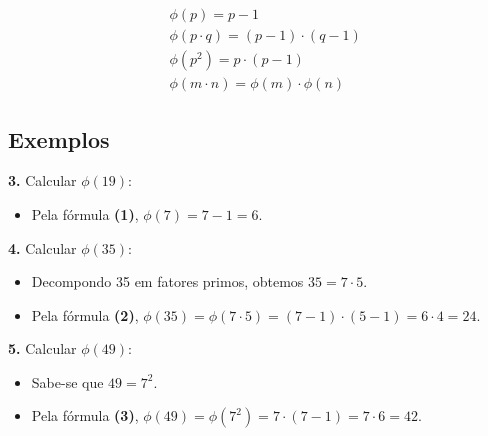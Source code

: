 \setcounter{equation}{0}
\begin{align}
     & \phi(p) = p-1                           \\
     & \phi(p \cdot q) = (p-1)\cdot(q-1)       \\
     & \phi(p^{2}) = p \cdot (p-1)             \\
     & \phi(m \cdot n) = \phi(m) \cdot \phi(n)
\end{align}

\subsection*{Exemplos}
\textbf{3.} Calcular $\phi(19)$:

\begin{itemize}
    \item Pela fórmula \textbf{(1)}, $\phi(7) = 7 - 1 = 6$.
\end{itemize}
\vspace{12pt}
\textbf{4.} Calcular $\phi(35)$:

\begin{itemize}
    \item Decompondo 35 em fatores primos, obtemos $35 = 7 \cdot 5$.
    \item Pela fórmula \textbf{(2)}, $\phi(35) = \phi(7 \cdot 5) = (7 - 1) \cdot (5 - 1) = 6 \cdot 4 = 24$.
\end{itemize}
\vspace{12pt}
\textbf{5.} Calcular $\phi(49)$:

\begin{itemize}
    \item Sabe-se que $49 = 7^{2}$.
    \item Pela fórmula \textbf{(3)}, $\phi(49) = \phi(7^{2}) = 7 \cdot (7 - 1) = 7 \cdot 6 = 42$.
\end{itemize}
